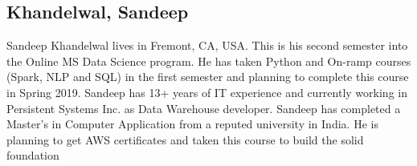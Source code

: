 \subsection{Khandelwal, Sandeep}

Sandeep Khandelwal lives in Fremont, CA, USA. This is his second
semester into the Online MS Data Science program. He has taken Python
and On-ramp courses (Spark, NLP and SQL) in the first semester and
planning to complete this course in Spring 2019. Sandeep has 13+ years
of IT experience and currently working in Persistent Systems Inc. as
Data Warehouse developer. Sandeep has completed a Master's in Computer
Application from a reputed university in India. He is planning to get
AWS certificates and taken this course to build the solid foundation

